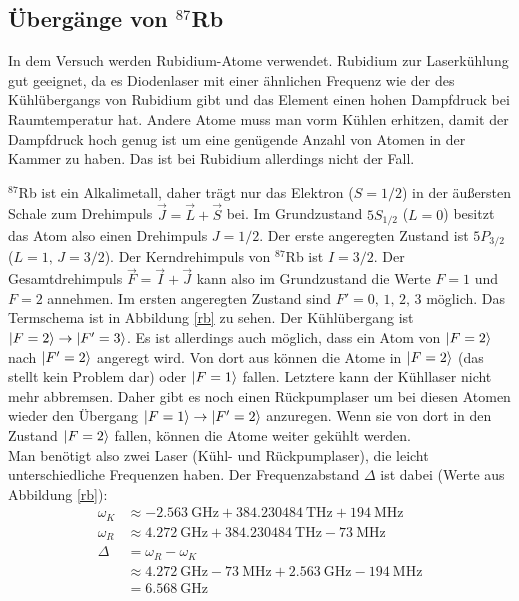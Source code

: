 \documentclass[12pt, a4paper]{article}
\begin{document}
  \subsection{Übergänge von ${}^{87}$Rb}
  In dem Versuch werden Rubidium-Atome verwendet. Rubidium zur Laserkühlung gut geeignet, da es Diodenlaser mit einer ähnlichen Frequenz wie der des Kühlübergangs von Rubidium gibt und das Element einen hohen Dampfdruck bei Raumtemperatur hat. Andere Atome muss man vorm Kühlen erhitzen, damit der Dampfdruck hoch genug ist um eine genügende Anzahl von Atomen in der Kammer zu haben. Das ist bei Rubidium allerdings nicht der Fall.
  
${}^{87}$Rb ist ein Alkalimetall, daher trägt nur das Elektron ($S=1/2$) in der äußersten Schale zum Drehimpuls $\vec{J}=\vec{L}+\vec{S}$ bei. Im Grundzustand $5S_{1/2}$ ($L=0$) besitzt das Atom also einen Drehimpuls $J = 1/2$. Der erste angeregten Zustand ist $5P_{3/2}$ ($L=1,\, J=3/2$). Der Kerndrehimpuls von ${}^{87}$Rb ist $I=3/2$. Der Gesamtdrehimpuls $\vec{F}=\vec{I}+\vec{J}$ kann also im Grundzustand die Werte $F = 1$ und $F = 2$ annehmen. Im ersten angeregten Zustand sind $F'= 0,\, 1,\, 2,\, 3$ möglich. Das Termschema ist in Abbildung \ref{rb} zu sehen.
   Der Kühlübergang ist $\ket{F=2}\rightarrow\ket{F'=3}$. Es ist allerdings auch möglich, dass ein Atom von $\ket{F=2}$ nach $\ket{F'=2}$ angeregt wird. Von dort aus können die Atome in $\ket{F=2}$ (das stellt kein Problem dar) oder $\ket{F=1}$ fallen. Letztere kann der Kühllaser nicht mehr abbremsen. Daher gibt es noch einen Rückpumplaser um bei diesen Atomen wieder den Übergang $\ket{F=1}\rightarrow\ket{F'=2}$ anzuregen. Wenn sie von dort in den Zustand $\ket{F=2}$ fallen, können die Atome weiter gekühlt werden.
   \\Man benötigt also zwei Laser (Kühl- und Rückpumplaser), die leicht unterschiedliche Frequenzen haben. Der Frequenzabstand $\Delta$ ist dabei (Werte aus Abbildung \ref{rb}):
   \begin{align*}
     \omega_K & \approx - \SI{2,563}{\GHz} + \SI{384,230484}{\THz} + \SI{194}{\MHz} \\
     \omega_R & \approx \SI{4,272}{\GHz} + \SI{384,230484}{\THz} - \SI{73}{\MHz} \\
     \Delta & = \omega_R - \omega_K \\
     & \approx \SI{4,272}{\GHz} - \SI{73}{\MHz} + \SI{2,563}{\GHz} - \SI{194}{\MHz} \\
     & = \SI{6,568}{\GHz}
   \end{align*}
\newpage
\end{document}
